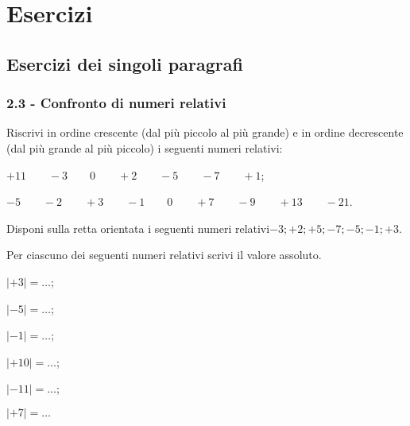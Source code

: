 \section{Esercizi}
\subsection{Esercizi dei singoli paragrafi}
\subsubsection*{2.3 - Confronto di numeri relativi}


\begin{esercizio}
 \label{ese:2.1}
Riscrivi in ordine crescente (dal più piccolo al più grande) e in ordine decrescente (dal più grande al più piccolo) i seguenti numeri relativi:
\begin{enumeratea}
\item $ +11\qquad-3\qquad0\qquad+2\qquad-5\qquad-7\qquad+1 $;
\item $ -5\qquad-2\qquad+3\qquad-1\qquad0\qquad+7\qquad-9\qquad+13\qquad-21 $.
\end{enumeratea}
\end{esercizio}

\begin{esercizio}
 \label{ese:2.2}
Disponi sulla retta orientata i seguenti numeri relativi$-3; +2; +5; -7; -5; -1; +3$.
\begin{center}
 
\end{center}

\end{esercizio}

\begin{esercizio}
 \label{ese:2.3}
Per ciascuno dei seguenti numeri relativi scrivi il valore assoluto.
\begin{multicols}{3}
\begin{enumeratea}
 \item $|+3|=\ldots$;
 \item $|-5|=\ldots$;
 \item $|-1|=\ldots$;
 \item $|+10|=\ldots$;
 \item $|-11|=\ldots$;
 \item $|+7|=\ldots$
\end{enumeratea}
\end{multicols}
\end{esercizio}

